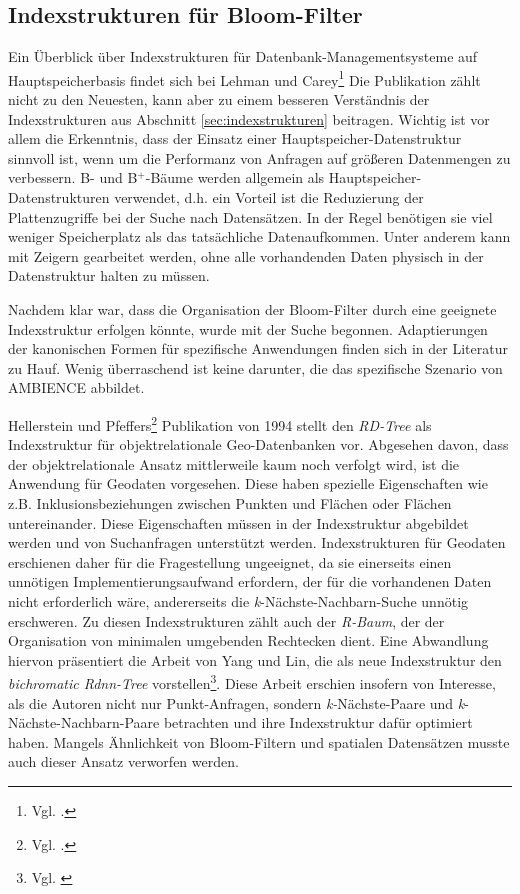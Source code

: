 \subsection{Indexstrukturen für Bloom-Filter}
Ein Überblick über Indexstrukturen für Datenbank-Managementsysteme auf Hauptspeicherbasis findet sich bei Lehman und Carey\footnote{Vgl. \cite{Lehman1896}.} Die Publikation zählt nicht zu den Neuesten, kann aber zu einem besseren Verständnis der Indexstrukturen aus Abschnitt \ref{sec:indexstrukturen} beitragen. Wichtig ist vor allem die Erkenntnis, dass der Einsatz einer Hauptspeicher-Datenstruktur sinnvoll ist, wenn um die Performanz von Anfragen auf größeren Datenmengen zu verbessern. B- und B$^+$-Bäume werden allgemein als Hauptspeicher-Datenstruk\-turen verwendet, d.h. ein Vorteil ist die Reduzierung der Plattenzugriffe bei der Suche nach Datensätzen. In der Regel benötigen sie viel weniger Speicherplatz als das tatsächliche Datenaufkommen. Unter anderem kann mit Zeigern gearbeitet werden, ohne alle vorhandenden Daten physisch in der Datenstruktur halten zu müssen. 

Nachdem klar war, dass die Organisation der Bloom-Filter durch eine geeignete Indexstruktur erfolgen könnte, wurde mit der Suche begonnen. Adaptierungen der kanonischen Formen für spezifische Anwendungen finden sich in der Literatur zu Hauf. Wenig überraschend ist keine darunter, die das spezifische Szenario von AMBIENCE abbildet.

Hellerstein und Pfeffers\footnote{Vgl. \cite{Hellerstein1994}.} Publikation von 1994 stellt den \textit{RD-Tree} als Indexstruktur für objektrelationale Geo-Datenbanken vor. Abgesehen davon, dass der objektrelationale Ansatz mittlerweile kaum noch verfolgt wird, ist die Anwendung für Geodaten vorgesehen. Diese haben spezielle Eigenschaften wie z.B. Inklusionsbeziehungen zwischen Punkten und Flächen oder Flächen untereinander. Diese Eigenschaften müssen in der Indexstruktur abgebildet werden und von Suchanfragen unterstützt werden. Indexstrukturen für Geodaten erschienen daher für die Fragestellung ungeeignet, da sie einerseits einen unnötigen Implementierungsaufwand erfordern, der für die vorhandenen Daten nicht erforderlich wäre, andererseits die \textit{k}-Nächste-Nachbarn-Suche unnötig erschweren. Zu diesen Indexstrukturen zählt auch der \textit{R-Baum}, der der Organisation von minimalen umgebenden Rechtecken dient. Eine Abwandlung hiervon präsentiert die Arbeit von Yang und Lin, die als neue Indexstruktur den \textit{bichromatic Rdnn-Tree} vorstellen\footnote{Vgl. \cite{Yang2002}}. Diese Arbeit erschien insofern von Interesse, als die Autoren nicht nur Punkt-Anfragen, sondern \textit{k-}Nächste-Paare und \textit{k}-Nächste-Nachbarn-Paare betrachten und ihre Indexstruktur dafür optimiert haben. Mangels Ähnlichkeit von Bloom-Filtern und spatialen Datensätzen musste auch dieser Ansatz verworfen werden. 

